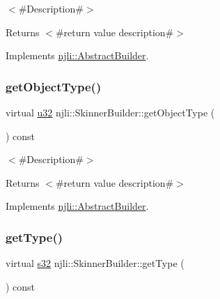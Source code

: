 $<$\#\+Description\#$>$

\begin{DoxyReturn}{Returns}
$<$\#return value description\#$>$ 
\end{DoxyReturn}


Implements \mbox{\hyperlink{classnjli_1_1_abstract_builder_a902f73ea78031b06aca183a417f3413b}{njli\+::\+Abstract\+Builder}}.

\mbox{\label{classnjli_1_1_skinner_builder_af5a6f6f73b0a7d61b4a558ab76fee5a1}} 
\subsubsection{\texorpdfstring{get\+Object\+Type()}{getObjectType()}}
{\footnotesize\ttfamily virtual \mbox{\hyperlink{_util_8h_a10e94b422ef0c20dcdec20d31a1f5049}{u32}} njli\+::\+Skinner\+Builder\+::get\+Object\+Type (\begin{DoxyParamCaption}{ }\end{DoxyParamCaption}) const\hspace{0.3cm}{\ttfamily [virtual]}}

$<$\#\+Description\#$>$

\begin{DoxyReturn}{Returns}
$<$\#return value description\#$>$ 
\end{DoxyReturn}


Implements \mbox{\hyperlink{classnjli_1_1_abstract_builder_a0f2d344fcf697b167f4f2b1122b5fb33}{njli\+::\+Abstract\+Builder}}.

\mbox{\label{classnjli_1_1_skinner_builder_a63933de3879401bd9d2681d7c97b6e5e}} 
\subsubsection{\texorpdfstring{get\+Type()}{getType()}}
{\footnotesize\ttfamily virtual \mbox{\hyperlink{_util_8h_aa62c75d314a0d1f37f79c4b73b2292e2}{s32}} njli\+::\+Skinner\+Builder\+::get\+Type (\begin{DoxyParamCaption}{ }\end{DoxyParamCaption}) const\hspace{0.3cm}{\ttfamily [virtual]}}

